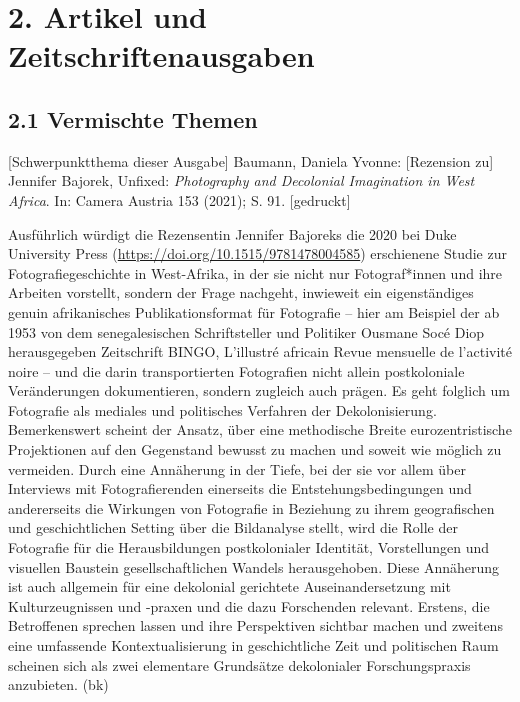 \documentclass[a4paper,
fontsize=11pt,
oneside,
numbers=noperiodatend,
parskip=half-,
bibliography=totoc,
final
]{scrartcl}
\begin{document}
\pagebreak
\hypertarget{artikel-und-zeitschriftenausgaben}{%
\section{2. Artikel und
Zeitschriftenausgaben}\label{artikel-und-zeitschriftenausgaben}}

\hypertarget{vermischte-themen}{%
\subsection{2.1 Vermischte Themen}\label{vermischte-themen}}

{[}Schwerpunktthema dieser Ausgabe{]} Baumann, Daniela Yvonne:
{[}Rezension zu{]} Jennifer Bajorek, Unfixed: \emph{Photography and
Decolonial Imagination in West Africa}. In: Camera Austria 153 (2021);
S. 91. {[}gedruckt{]}

Ausführlich würdigt die Rezensentin Jennifer Bajoreks die 2020 bei Duke
University Press (\url{https://doi.org/10.1515/9781478004585})
erschienene Studie zur Fotografiegeschichte in West-Afrika, in der sie
nicht nur Fotograf*innen und ihre Arbeiten vorstellt, sondern der Frage
nachgeht, inwieweit ein eigenständiges genuin afrikanisches
Publikationsformat für Fotografie -- hier am Beispiel der ab 1953 von
dem senegalesischen Schriftsteller und Politiker Ousmane Socé Diop
herausgegeben Zeitschrift BINGO, L'illustré africain Revue mensuelle de
l'activité noire -- und die darin transportierten Fotografien nicht
allein postkoloniale Veränderungen dokumentieren, sondern zugleich auch
prägen. Es geht folglich um Fotografie als mediales und politisches
Verfahren der Dekolonisierung. Bemerkenswert scheint der Ansatz, über
eine methodische Breite eurozentristische Projektionen auf den
Gegenstand bewusst zu machen und soweit wie möglich zu vermeiden. Durch
eine Annäherung in der Tiefe, bei der sie vor allem über Interviews mit
Fotografierenden einerseits die Entstehungsbedingungen und andererseits
die Wirkungen von Fotografie in Beziehung zu ihrem geografischen und
geschichtlichen Setting über die Bildanalyse stellt, wird die Rolle der
Fotografie für die Herausbildungen postkolonialer Identität,
Vorstellungen und visuellen Baustein gesellschaftlichen Wandels
herausgehoben. Diese Annäherung ist auch allgemein für eine dekolonial
gerichtete Auseinandersetzung mit Kulturzeugnissen und -praxen und die
dazu Forschenden relevant. Erstens, die Betroffenen sprechen lassen und
ihre Perspektiven sichtbar machen und zweitens eine umfassende
Kontextualisierung in geschichtliche Zeit und politischen Raum scheinen
sich als zwei elementare Grundsätze dekolonialer Forschungspraxis
anzubieten. (bk)
\end{document}
